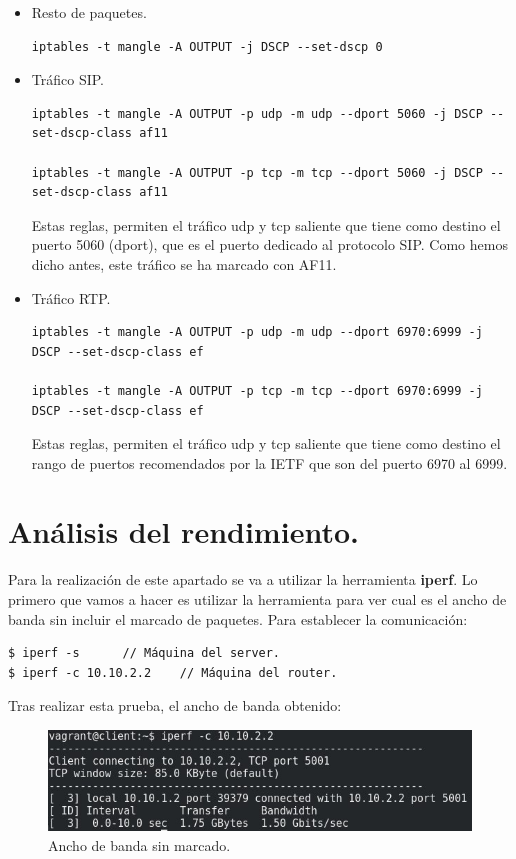 \documentclass[11pt]{article}
\begin{document}
\begin{itemize}
\begin{itemize}
\item Resto de paquetes.
\begin{lstlisting}[style=C,numbers=none]
iptables -t mangle -A OUTPUT -j DSCP --set-dscp 0
\end{lstlisting}

\item Tráfico SIP.
\begin{lstlisting}[style=C,numbers=none]
iptables -t mangle -A OUTPUT -p udp -m udp --dport 5060 -j DSCP --set-dscp-class af11

iptables -t mangle -A OUTPUT -p tcp -m tcp --dport 5060 -j DSCP --set-dscp-class af11
\end{lstlisting}
Estas reglas, permiten el tráfico udp y tcp saliente que tiene como destino el puerto 5060 (dport), que es el puerto dedicado al protocolo SIP. Como hemos dicho antes, este tráfico se ha marcado con AF11. \\

\item Tráfico RTP.
\begin{lstlisting}[style=C,numbers=none]
iptables -t mangle -A OUTPUT -p udp -m udp --dport 6970:6999 -j DSCP --set-dscp-class ef

iptables -t mangle -A OUTPUT -p tcp -m tcp --dport 6970:6999 -j DSCP --set-dscp-class ef
\end{lstlisting}

Estas reglas, permiten el tráfico udp y tcp saliente que tiene como destino el rango de puertos recomendados por la IETF que son del puerto 6970 al 6999.
\end{itemize}

\end{itemize}
\newpage

\section{Análisis del rendimiento.}
Para la realización de este apartado se va a utilizar la herramienta \textbf{iperf}. Lo primero que vamos a hacer es utilizar la herramienta para ver cual es el ancho de banda sin incluir el marcado de paquetes. Para establecer la comunicación:
\begin{lstlisting}[style=C,numbers=none]
$ iperf -s 		// Máquina del server.
$ iperf -c 10.10.2.2	// Máquina del router.
\end{lstlisting}

Tras realizar esta prueba, el ancho de banda obtenido:

\begin{figure}[hbtp]
\centering
\includegraphics[scale=0.8]{anchodebandasin.jpg}
\caption{Ancho de banda sin marcado.}
\end{figure}
\end{document}
